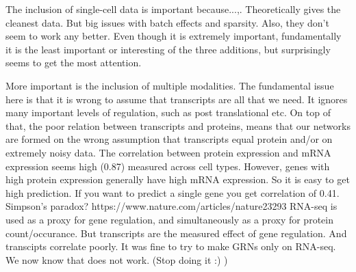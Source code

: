 The inclusion of single-cell data is important because...,. Theoretically gives the cleanest data. But big issues with batch effects and sparsity. Also, they don't seem to work any better. Even though it is extremely important, fundamentally it is the least important or interesting of the three additions, but surprisingly seems to get the most attention.

More important is the inclusion of multiple modalities. The fundamental issue here is that it is wrong to assume that transcripts are all that we need. It ignores many important levels of regulation, such as post translational etc. On top of that, the poor relation between transcripts and proteins, means that our networks are formed on the wrong assumption that transcripts equal protein and/or on extremely noisy data. The correlation between protein expression and mRNA expression seems high (0.87) measured across cell types. However, genes with high protein expression generally have high mRNA expression. So it is easy to get high prediction. If you want to predict a single gene you get correlation of 0.41. Simpson's paradox?
https://www.nature.com/articles/nature23293
RNA-seq is used as a proxy for gene regulation, and simultaneously as a proxy for protein count/occurance. But transcripts are the measured effect of gene regulation. And transcipts correlate poorly. It was fine to try to make GRNs only on RNA-seq. We now know that does not work. (Stop doing it :) )

